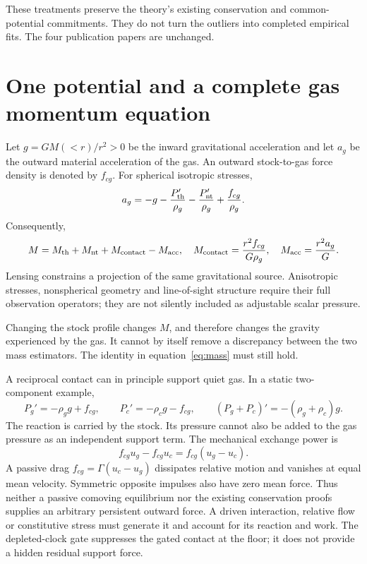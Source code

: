 \documentclass[11pt]{article}
\begin{document}
These treatments preserve the theory's existing conservation and common-potential commitments. They do not turn the outliers into completed empirical fits. The four publication papers are unchanged.

\clearpage
\section{One potential and a complete gas momentum equation}
Let $g=GM(<r)/r^2>0$ be the inward gravitational acceleration and let $a_g$ be the outward material acceleration of the gas. An outward stock-to-gas force density is denoted by $f_{cg}$. For spherical isotropic stresses,
\begin{equation}
a_g=-g-\frac{P_{\rm th}'}{\rho_g}
          -\frac{P_{\rm nt}'}{\rho_g}
          +\frac{f_{cg}}{\rho_g}.
\end{equation}
Consequently,
\begin{equation}
M=M_{\rm th}+M_{\rm nt}+M_{\rm contact}-M_{\rm acc},
\quad
M_{\rm contact}=\frac{r^2f_{cg}}{G\rho_g},
\quad
M_{\rm acc}=\frac{r^2a_g}{G}.
\label{eq:mass}
\end{equation}
Lensing constrains a projection of the same gravitational source. Anisotropic stresses, nonspherical geometry and line-of-sight structure require their full observation operators; they are not silently included as adjustable scalar pressure.

Changing the stock profile changes $M$, and therefore changes the gravity experienced by the gas. It cannot by itself remove a discrepancy between the two mass estimators. The identity in equation~\eqref{eq:mass} must still hold.

A reciprocal contact can in principle support quiet gas. In a static two-component example,
\[
P_g'=-\rho_g g+f_{cg},\qquad
P_c'=-\rho_c g-f_{cg},
\qquad
(P_g+P_c)'=-(\rho_g+\rho_c)g.
\]
The reaction is carried by the stock. Its pressure cannot also be added to the gas pressure as an independent support term. The mechanical exchange power is
\[
f_{cg}u_g-f_{cg}u_c=f_{cg}(u_g-u_c).
\]
A passive drag $f_{cg}=\Gamma(u_c-u_g)$ dissipates relative motion and vanishes at equal mean velocity. Symmetric opposite impulses also have zero mean force. Thus neither a passive comoving equilibrium nor the existing conservation proofs supplies an arbitrary persistent outward force. A driven interaction, relative flow or constitutive stress must generate it and account for its reaction and work. The depleted-clock gate suppresses the gated contact at the floor; it does not provide a hidden residual support force.
\end{document}
